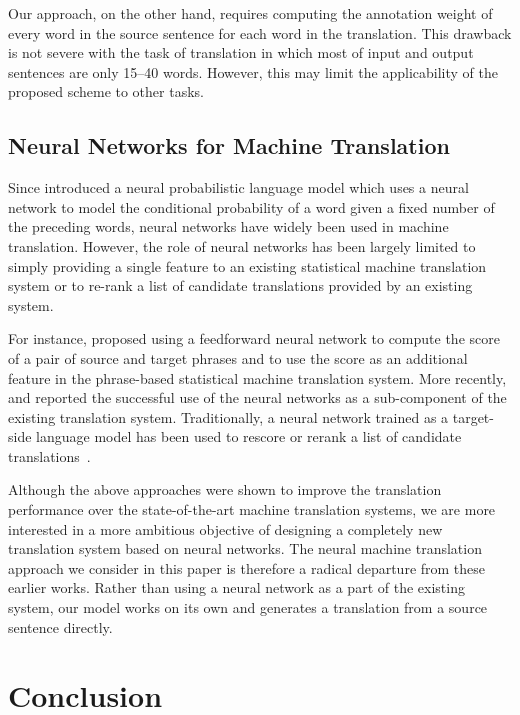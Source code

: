 \documentclass{article} %
\begin{document}
Our approach, on the other hand, requires computing the annotation weight of
every word in the source sentence for each word in the translation. This
drawback is not severe with the task of translation in which most of input and
output sentences are only 15--40 words. However, this may limit the
applicability of the proposed scheme to other tasks.


\subsection{Neural Networks for Machine Translation}

Since \citet{Bengio2003lm} introduced a neural probabilistic language model
which uses a neural network to model the conditional probability of a word given
a fixed number of the preceding words, neural networks have widely been used in
machine translation. However, the role of neural networks has been largely
limited to simply providing a single feature to an existing statistical machine
translation system or to re-rank a list of candidate translations provided by an
existing system. 

For instance, \citet{Schwenk2012} proposed using a feedforward neural network to
compute the score of a pair of source and target phrases and to use the score as
an additional feature in the phrase-based statistical machine translation
system. More recently, \citet{Kalchbrenner2013} and \citet{Devlin2014} reported
the successful use of the neural networks as a sub-component of the existing
translation system. Traditionally, a neural network trained as a target-side
language model has been used to rescore or rerank a list of candidate
translations~\citep[see, e.g.,][]{Schwenk2006t}.

Although the above approaches were shown to improve the translation performance
over the state-of-the-art machine translation systems, we are more interested in
a more ambitious objective of designing a completely new translation system
based on neural networks. The neural machine translation approach we consider in
this paper is therefore a radical departure from these earlier works. Rather
than using a neural network as a part of the existing system, our model works on
its own and generates a translation from a source sentence directly.


\section{Conclusion}
\end{document}
